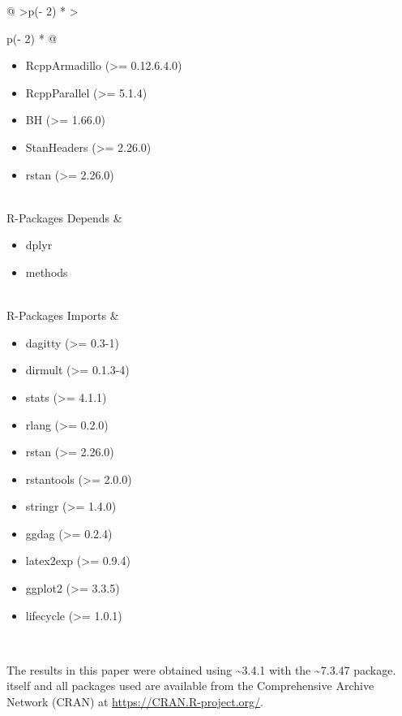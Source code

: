 \documentclass[
  11pt,
  article]{jss}
\providecommand{\tightlist}{%
  \setlength{\itemsep}{0pt}\setlength{\parskip}{0pt}}\usepackage{longtable,booktabs,array}
\begin{document}
\begin{longtable}[]{@{}
  >{\raggedleft\arraybackslash}p{(\columnwidth - 2\tabcolsep) * }
  >{\raggedright\arraybackslash}p{(\columnwidth - 2\tabcolsep) * }@{}}
\begin{minipage}[t]{\linewidth}
\begin{itemize}
  RcppEigen (\textgreater= 0.3.3.3.0)
\item
  RcppArmadillo (\textgreater= 0.12.6.4.0)
\item
  RcppParallel (\textgreater= 5.1.4)
\item
  BH (\textgreater= 1.66.0)
\item
  StanHeaders (\textgreater= 2.26.0)
\item
  rstan (\textgreater= 2.26.0)
\end{itemize}
\end{minipage} \\
R-Packages Depends & \begin{minipage}[t]{\linewidth}\raggedright
\begin{itemize}
\tightlist
\item
  dplyr
\item
  methods
\end{itemize}
\end{minipage} \\
R-Packages Imports & \begin{minipage}[t]{\linewidth}\raggedright
\begin{itemize}
\tightlist
\item
  dagitty (\textgreater= 0.3-1)
\item
  dirmult (\textgreater= 0.1.3-4)
\item
  stats (\textgreater= 4.1.1)
\item
  rlang (\textgreater= 0.2.0)
\item
  rstan (\textgreater= 2.26.0)
\item
  rstantools (\textgreater= 2.0.0)
\item
  stringr (\textgreater= 1.4.0)
\item
  ggdag (\textgreater= 0.2.4)
\item
  latex2exp (\textgreater= 0.9.4)
\item
  ggplot2 (\textgreater= 3.3.5)
\item
  lifecycle (\textgreater= 1.0.1)
\end{itemize}
\end{minipage} \\
\end{longtable}

The results in this paper were obtained using
\textasciitilde3.4.1 with the
\textasciitilde7.3.47 package.  itself and all
packages used are available from the Comprehensive  Archive
Network (CRAN) at \url{https://CRAN.R-project.org/}.
\end{document}
